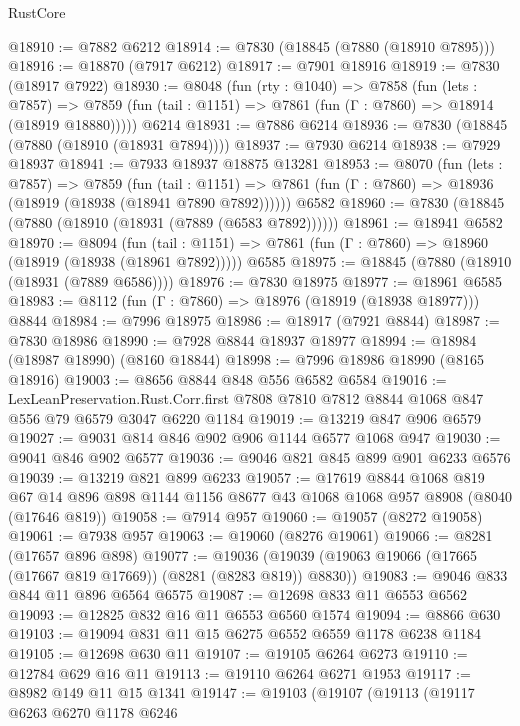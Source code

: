 \begin{lexlean}{RustCore}
\begin{coremodule}
@18910 := @7882 @6212
@18914 := @7830 (@18845 (@7880 (@18910 @7895)))
@18916 := @18870 (@7917 @6212)
@18917 := @7901 @18916
@18919 := @7830 (@18917 @7922)
@18930 := @8048
    (fun (rty : @1040) =>
    @7858
      (fun (lets : @7857) =>
      @7859 (fun (tail : @1151) => @7861 (fun (Γ : @7860) => @18914 (@18919 @18880)))))
    @6214
@18931 := @7886 @6214
@18936 := @7830 (@18845 (@7880 (@18910 (@18931 @7894))))
@18937 := @7930 @6214
@18938 := @7929 @18937
@18941 := @7933 @18937 @18875 @13281
@18953 := @8070
    (fun (lets : @7857) =>
    @7859
      (fun (tail : @1151) =>
      @7861 (fun (Γ : @7860) => @18936 (@18919 (@18938 (@18941 @7890 @7892))))))
    @6582
@18960 := @7830 (@18845 (@7880 (@18910 (@18931 (@7889 (@6583 @7892))))))
@18961 := @18941 @6582
@18970 := @8094
    (fun (tail : @1151) => @7861 (fun (Γ : @7860) => @18960 (@18919 (@18938 (@18961 @7892)))))
    @6585
@18975 := @18845 (@7880 (@18910 (@18931 (@7889 @6586))))
@18976 := @7830 @18975
@18977 := @18961 @6585
@18983 := @8112 (fun (Γ : @7860) => @18976 (@18919 (@18938 @18977))) @8844
@18984 := @7996 @18975
@18986 := @18917 (@7921 @8844)
@18987 := @7830 @18986
@18990 := @7928 @8844 @18937 @18977
@18994 := @18984 (@18987 @18990) (@8160 @18844)
@18998 := @7996 @18986 @18990 (@8165 @18916)
@19003 := @8656 @8844 @848 @556 @6582 @6584
@19016 := LexLeanPreservation.Rust.Corr.first
    @7808
    @7810
    @7812
    @8844
    @1068
    @847
    @556
    @79
    @6579
    @3047
    @6220
    @1184
@19019 := @13219 @847 @906 @6579
@19027 := @9031 @814 @846 @902 @906 @1144 @6577 @1068 @947
@19030 := @9041 @846 @902 @6577
@19036 := @9046 @821 @845 @899 @901 @6233 @6576
@19039 := @13219 @821 @899 @6233
@19057 := @17619
    @8844
    @1068
    @819
    @67
    @14
    @896
    @898
    @1144
    @1156
    @8677
    @43
    @1068
    @1068
    @957
    @8908
    (@8040 (@17646 @819))
@19058 := @7914 @957
@19060 := @19057 (@8272 @19058)
@19061 := @7938 @957
@19063 := @19060 (@8276 @19061)
@19066 := @8281 (@17657 @896 @898)
@19077 := @19036 (@19039 (@19063 @19066 (@17665 (@17667 @819 @17669)) (@8281 (@8283 @819)) @8830))
@19083 := @9046 @833 @844 @11 @896 @6564 @6575
@19087 := @12698 @833 @11 @6553 @6562
@19093 := @12825 @832 @16 @11 @6553 @6560 @1574
@19094 := @8866 @630
@19103 := @19094 @831 @11 @15 @6275 @6552 @6559 @1178 @6238 @1184
@19105 := @12698 @630 @11
@19107 := @19105 @6264 @6273
@19110 := @12784 @629 @16 @11
@19113 := @19110 @6264 @6271 @1953
@19117 := @8982 @149 @11 @15 @1341
@19147 := @19103
    (@19107
      (@19113
        (@19117
          @6263
          @6270
          @1178
          @6246

\end{coremodule}
\end{lexlean}
